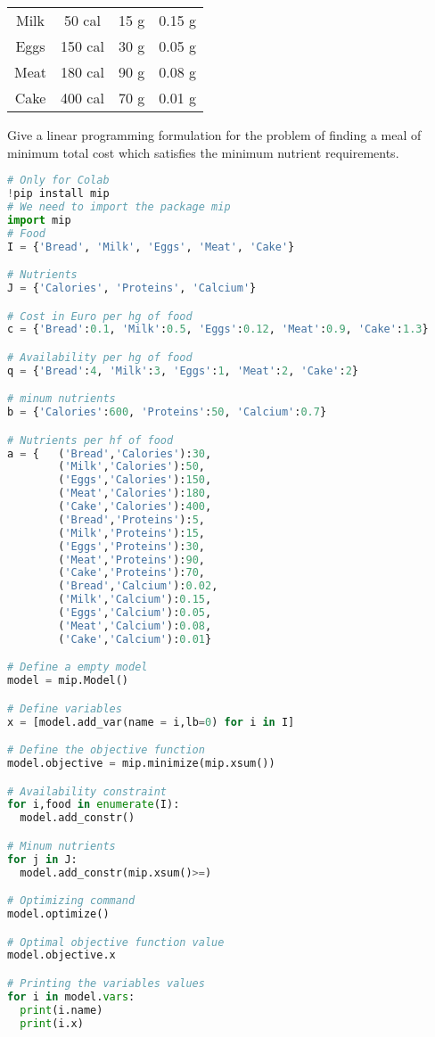 \documentclass[12pt, a4paper]{report}
\newtheorem[style=M,bodystyle=\normalfont]{theorem}{Theorem}
\newtheorem[style=M,bodystyle=\normalfont]{corollary}{Corollary}
\newtheorem[style=M,bodystyle=\normalfont]{lemma}{Lemma}
\newtheorem[style=M,bodystyle=\normalfont]{definition}{Definition}
\begin{document}
\begin{Exercise}[label=1]
\begin{table}[H]
\begin{tabular}{|cccc|}
        \multicolumn{1}{|c|}{Milk}  & \multicolumn{1}{c|}{50 cal}  & \multicolumn{1}{c|}{15 g} & 0.15 g           \\
        \multicolumn{1}{|c|}{Eggs}  & \multicolumn{1}{c|}{150 cal} & \multicolumn{1}{c|}{30 g} & 0.05 g           \\
        \multicolumn{1}{|c|}{Meat}  & \multicolumn{1}{c|}{180 cal} & \multicolumn{1}{c|}{90 g} & 0.08 g           \\
        \multicolumn{1}{|c|}{Cake}  & \multicolumn{1}{c|}{400 cal} & \multicolumn{1}{c|}{70 g} & 0.01 g           \\ \hline
        \end{tabular}
    \end{table}
    Give a linear programming formulation for the problem of finding a meal of minimum total cost which satisfies the minimum nutrient requirements.
\end{Exercise}
\begin{Answer}[ref=1]
    \begin{lstlisting}[language=Python]
# Only for Colab
!pip install mip
# We need to import the package mip
import mip
# Food
I = {'Bread', 'Milk', 'Eggs', 'Meat', 'Cake'}

# Nutrients
J = {'Calories', 'Proteins', 'Calcium'}

# Cost in Euro per hg of food
c = {'Bread':0.1, 'Milk':0.5, 'Eggs':0.12, 'Meat':0.9, 'Cake':1.3}

# Availability per hg of food
q = {'Bread':4, 'Milk':3, 'Eggs':1, 'Meat':2, 'Cake':2}

# minum nutrients 
b = {'Calories':600, 'Proteins':50, 'Calcium':0.7}

# Nutrients per hf of food
a = {   ('Bread','Calories'):30,
        ('Milk','Calories'):50,
        ('Eggs','Calories'):150,
        ('Meat','Calories'):180,
        ('Cake','Calories'):400,
        ('Bread','Proteins'):5,
        ('Milk','Proteins'):15,
        ('Eggs','Proteins'):30,
        ('Meat','Proteins'):90,
        ('Cake','Proteins'):70,
        ('Bread','Calcium'):0.02,
        ('Milk','Calcium'):0.15,
        ('Eggs','Calcium'):0.05,
        ('Meat','Calcium'):0.08,
        ('Cake','Calcium'):0.01}

# Define a empty model
model = mip.Model()

# Define variables
x = [model.add_var(name = i,lb=0) for i in I]

# Define the objective function
model.objective = mip.minimize(mip.xsum())

# Availability constraint
for i,food in enumerate(I):
  model.add_constr()

# Minum nutrients
for j in J:
  model.add_constr(mip.xsum()>=)

# Optimizing command
model.optimize()

# Optimal objective function value
model.objective.x

# Printing the variables values
for i in model.vars:
  print(i.name)
  print(i.x)
    \end{lstlisting}
\end{Answer}

\newpage


\newpage
\end{document}
